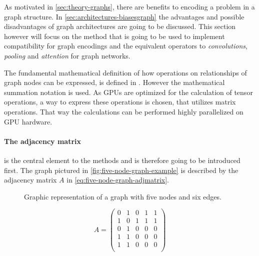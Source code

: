 As motivated in \autoref{sec:theory-graphs}, there are benefits to encoding a problem in a graph structure.
In \autoref{sec:architectures-biasesgraph} the advantages and possible disadvantages of graph architectures are going to be discussed. 
This section however will focus on the method that is going to be used to implement compatibility for graph encodings and the equivalent operators to \emph{convolutions}, \emph{pooling} and \emph{attention} for graph networks.

The fundamental mathematical definition of how operations on relationships of graph nodes can be expressed, is defined in \cite{relationalInductiveBiasesAndGraphNetworks}. 
However the mathematical summation notation is used. 
As GPUs are optimized for the calculation of tensor operations, a way to express these operations is chosen, that utilizes matrix operations.
That way the calculations can be performed highly parallelized on GPU hardware.

\paragraph{The adjacency matrix} is the central element to the methods and is therefore going to be introduced first.
The graph pictured in \autoref{fig:five-node-graph-example} is described by the adjacency matrix $A$ in \autoref{eq:five-node-graph-adjmatrix}.

\begin{figure}[htbp]
    \centering
    \caption{Graphic representation of a graph with five nodes and six edges.}
    \label{fig:five-node-graph-example}
\end{figure}

\begin{equation}
    \label{eq:five-node-graph-adjmatrix}
    A = \left(\begin{matrix}
        0 & 1 & 0 & 1 & 1 \\
        1 & 0 & 1 & 1 & 1 \\
        0 & 1 & 0 & 0 & 0 \\
        1 & 1 & 0 & 0 & 0 \\
        1 & 1 & 0 & 0 & 0 \\
    \end{matrix}\right)
\end{equation}

